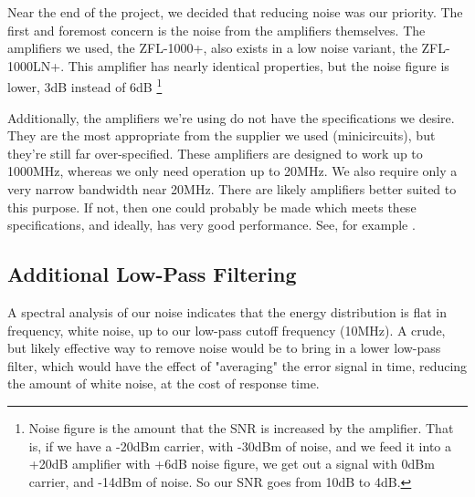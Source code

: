 Near the end of the project, we decided that reducing noise was our priority.  The first and foremost concern is the noise from the amplifiers themselves.  The amplifiers we used, the ZFL-1000+, also exists in a low noise variant, the ZFL-1000LN+.  This amplifier has nearly identical properties, but the noise figure is lower, 3dB instead of 6dB \footnote{Noise figure is the amount that the SNR is increased by the amplifier.  That is, if we have a -20dBm carrier, with -30dBm of noise, and we feed it into a +20dB amplifier with +6dB noise figure, we get out a signal with 0dBm carrier, and -14dBm of noise.  So our SNR goes from 10dB to 4dB.}

Additionally, the amplifiers we're using do not have the specifications we desire.  They are the most appropriate from the supplier we used (minicircuits), but they're still far over-specified.  These amplifiers are designed to work up to 1000MHz, whereas we only need operation up to 20MHz.  We also require only a very narrow bandwidth near 20MHz.  There are likely amplifiers better suited to this purpose.  If not, then one could probably be made which meets these specifications, and ideally, has very good performance.  See, for example \cite{ti_amps}.

\subsection{Additional Low-Pass Filtering}

A spectral analysis of our noise indicates that the energy distribution is flat in frequency, white noise, up to our low-pass cutoff frequency (10MHz).  A crude, but likely effective way to remove noise would be to bring in a lower low-pass filter, which would have the effect of "averaging" the error signal in time, reducing the amount of white noise, at the cost of response time.



